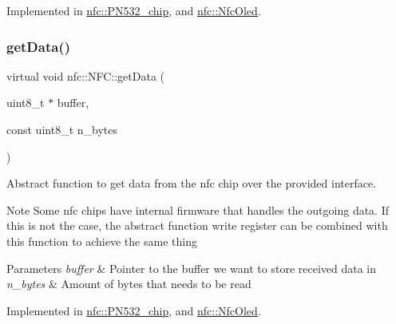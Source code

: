 Implemented in \hyperlink{classnfc_1_1PN532__chip_a35a81a5e67025f6c04e472e3bd9e508c}{nfc\+::\+P\+N532\+\_\+chip}, and \hyperlink{classnfc_1_1NfcOled_a8c233683d71236d6238d840eeeb5d626}{nfc\+::\+Nfc\+Oled}.

\mbox{\label{classnfc_1_1NFC_a3458fc807a5f0d485099a1e5f54bcbb5}} 
\subsubsection{\texorpdfstring{get\+Data()}{getData()}}
{\footnotesize\ttfamily virtual void nfc\+::\+N\+F\+C\+::get\+Data (\begin{DoxyParamCaption}\item[{uint8\+\_\+t $\ast$}]{buffer,  }\item[{const uint8\+\_\+t}]{n\+\_\+bytes }\end{DoxyParamCaption})\hspace{0.3cm}{\ttfamily [pure virtual]}}



Abstract function to get data from the nfc chip over the provided interface. 

\begin{DoxyNote}{Note}
Some nfc chips have internal firmware that handles the outgoing data. If this is not the case, the abstract function write register can be combined with this function to achieve the same thing 
\end{DoxyNote}

\begin{DoxyParams}{Parameters}
{\em buffer} & Pointer to the buffer we want to store received data in \\
\hline
{\em n\+\_\+bytes} & Amount of bytes that needs to be read \\
\hline
\end{DoxyParams}


Implemented in \hyperlink{classnfc_1_1PN532__chip_ae8414552a504fec6b62ad0be140e53e0}{nfc\+::\+P\+N532\+\_\+chip}, and \hyperlink{classnfc_1_1NfcOled_a4f9564fbbc2981031fbfbf50be308745}{nfc\+::\+Nfc\+Oled}.

\mbox{\label{classnfc_1_1NFC_a25a4f9824ac567c8ca37ea3486d32882}} 
